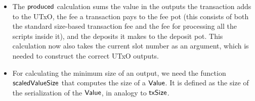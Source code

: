 \begin{itemize}
  \item The $\mathsf{produced}$ calculation sums the value in the outputs the
  transaction adds to the UTxO, the fee a transaction pays
  to the fee pot (this consists of both the standard size-based transaction fee
  and the fee for processing all the scripts inside it),
  and the deposits it makes
  to the deposit pot.
  This calculation now also takes the current slot number as an argument, which is
  needed to construct the correct UTxO outputs.

  \item For calculating the minimum size of an output, we need the
  function $\mathsf{scaledValueSize}$ that computes the size of a
  $\mathsf{Value}$. It is defined as the size of the serialization of the
  $\mathsf{Value}$, in analogy to $\mathsf{txSize}$.
\end{itemize}

